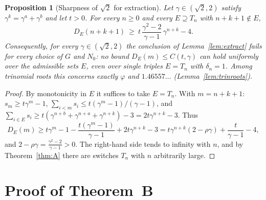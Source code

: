 \documentclass[11pt]{amsart}
\newtheorem{proposition}[lemma]{Proposition}
\theoremstyle{definition}
\theoremstyle{remark}
\begin{document}
\begin{proposition}[Sharpness of $\sqrt2$ for extraction]\label{prop:sharp}
Let $\gamma\in(\sqrt2,2)$ satisfy $\gamma^k=\gamma^a+\gamma^b$ and let $t>0$. For every $n\ge0$
and every $E\supseteq T_n$ with $n+k+1\notin E$,
\[
  D_E(n+k+1)\ \ge\ t\,\frac{\gamma^2-2}{\gamma-1}\,\gamma^{n+k}-4 .
\]
Consequently, for every $\gamma\in(\sqrt2,2)$ the conclusion of Lemma~\ref{lem:extract} fails
for every choice of $G$ and $N_0$: no bound $D_E(m)\le C(t,\gamma)$ can hold uniformly over
the admissible sets $E$, even over single triples $E=T_n$ with $\delta_n=1$. Among trinomial
roots this concerns exactly $\varphi$ and $1.46557\ldots$ (Lemma~\ref{lem:trinroots}).
\end{proposition}

\begin{proof}
By monotonicity in $E$ it suffices to take $E=T_n$. With $m=n+k+1$: $s_m\ge t\gamma^m-1$,
$\sum_{i<m}s_i\le t(\gamma^m-1)/(\gamma-1)$, and
$\sum_{i\in E}s_i\ge t(\gamma^{n+b}+\gamma^{n+a}+\gamma^{n+k})-3=2t\gamma^{n+k}-3$. Thus
\[
  D_E(m)\ge t\gamma^m-1-\frac{t(\gamma^m-1)}{\gamma-1}+2t\gamma^{n+k}-3
  =t\gamma^{n+k}(2-\rho\gamma)+\frac t{\gamma-1}-4,
\]
and $2-\rho\gamma=\frac{\gamma^2-2}{\gamma-1}>0$. The right-hand side tends to infinity with
$n$, and by Theorem~\ref{thm:A} there are switches $T_n$ with $n$ arbitrarily large.
\end{proof}

\section{Proof of Theorem~B}\label{sec:proofB}
\end{document}
